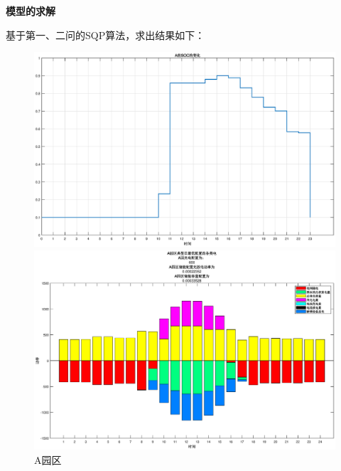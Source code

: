 \documentclass{cumcmthesis}
\begin{document}
\textbf{模型的求解}

基于第一、二问的SQP算法，求出结果如下：


  \begin{figure}[!h]  
\centering 
\begin{minipage}{.5\textwidth}  
  \centering  
  \includegraphics[width=.99\linewidth]{figures/Q31_A_SOC.eps}  
\end{minipage}%
\begin{minipage}{.5\textwidth}  
  \centering  
  \includegraphics[width=.99\linewidth]{figures/Q31_A.eps}  
\end{minipage}  
\caption{A园区}  
\end{figure} 
\end{document}
